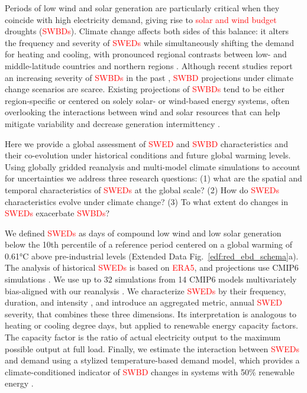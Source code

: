\documentclass[pdflatex,sn-mathphys-num]{sn-jnl}%
\begin{document}
Periods of low wind and solar generation are particularly critical when they coincide with high electricity demand, giving rise to \textcolor{red}{solar and wind budget} droughts (\textcolor{red}{SWBDs}). Climate change affects both sides of this balance: it alters the frequency and severity of \textcolor{red}{SWEDs} while simultaneously shifting the demand for heating and cooling, with pronounced regional contrasts between low- and middle-latitude countries and northern regions \cite{lizanaGlobalGriddedDataset2026, wenzNorthSouthPolarization2017}. Although recent studies report an increasing severity of \textcolor{red}{SWBDs} in the past \cite{zhengClimateChangeImpacts2024}, \textcolor{red}{SWBD} projections under climate change scenarios are scarce. Existing projections of \textcolor{red}{SWBDs} tend to be either region-specific or centered on solely solar- or wind-based energy systems, often overlooking the interactions between wind and solar resources that can help mitigate variability and decrease generation intermittency \cite{juraszComplementarityResourceDroughts2021, wangRisingWorldwideChallenges2025, liuClimateChangeImpacts2023}.

Here we provide a global assessment of \textcolor{red}{SWED} and \textcolor{red}{SWBD} characteristics and their co-evolution under historical conditions and future global warming levels. Using globally gridded reanalysis  and multi-model climate simulations to account for uncertainties we address three research questions: (1) what are the spatial and temporal characteristics of \textcolor{red}{SWEDs} at the global scale? (2) How do \textcolor{red}{SWEDs} characteristics evolve under climate change? (3) To what extent do changes in \textcolor{red}{SWEDs} exacerbate \textcolor{red}{SWBDs}? 

We defined \textcolor{red}{SWEDs} as days of compound low wind and low solar generation below the 10th percentile of a reference period centered on a global warming of 0.61°C above pre-industrial levels (Extended Data Fig.~\ref{edf:red_ebd_schema}a). The analysis of historical \textcolor{red}{SWEDs} is based on \textcolor{red}{ERA5}, and projections use CMIP6 simulations \cite{cucchiWFDE5BiasadjustedERA52020, gwlcmip6, Bracken2024, oteroCopulabasedAssessmentRenewable2022}. We use up to 32 simulations from 14 CMIP6 models multivariately bias-aligned with our reanalysis \cite{cannonMultivariateQuantileMapping2018}. We characterize \textcolor{red}{SWEDs} by their frequency, duration, and intensity \textcolor{red}{\cite{wilczakWindSolarEnergy2025}}, and introduce an aggregated metric, annual \textcolor{red}{SWED} severity, that combines these three dimensions. Its interpretation is analogous to heating or cooling degree days, but applied to renewable energy capacity factors. The capacity factor is the ratio of actual electricity output to the maximum possible output at full load. Finally, we estimate the interaction between \textcolor{red}{SWEDs} and demand using a stylized temperature-based demand model, which provides a climate-conditioned indicator of \textcolor{red}{SWBD} changes in systems with 50\% renewable energy  \cite{liuClimateChangeImpacts2023}.
\end{document}
